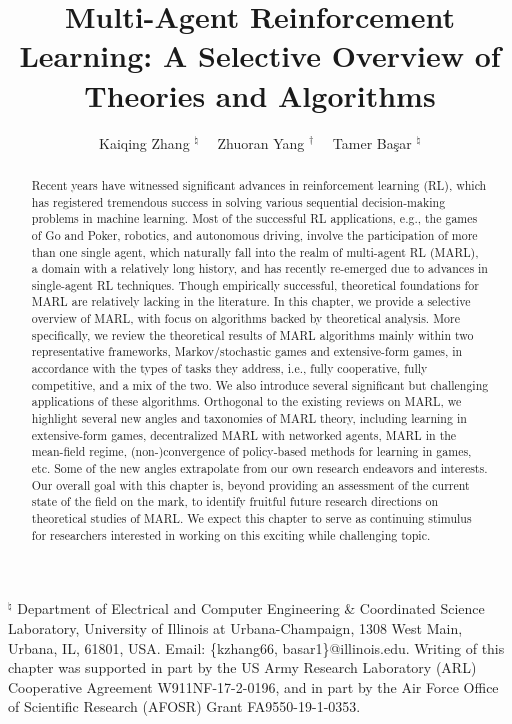 \documentclass[10pt]{article}
\title{Multi-Agent Reinforcement Learning: A Selective Overview of Theories and Algorithms }
\author{Kaiqing Zhang ${ }^{\natural} \quad$ Zhuoran Yang ${ }^{\dagger} \quad$ Tamer Başar ${ }^{\natural}$}
\date{}
\begin{document}
\maketitle


\begin{abstract}
Recent years have witnessed significant advances in reinforcement learning (RL), which has registered tremendous success in solving various sequential decision-making problems in machine learning. Most of the successful RL applications, e.g., the games of Go and Poker, robotics, and autonomous driving, involve the participation of more than one single agent, which naturally fall into the realm of multi-agent RL (MARL), a domain with a relatively long history, and has recently re-emerged due to advances in single-agent RL techniques. Though empirically successful, theoretical foundations for MARL are relatively lacking in the literature. In this chapter, we provide a selective overview of MARL, with focus on algorithms backed by theoretical analysis. More specifically, we review the theoretical results of MARL algorithms mainly within two representative frameworks, Markov/stochastic games and extensive-form games, in accordance with the types of tasks they address, i.e., fully cooperative, fully competitive, and a mix of the two. We also introduce several significant but challenging applications of these algorithms. Orthogonal to the existing reviews on MARL, we highlight several new angles and taxonomies of MARL theory, including learning in extensive-form games, decentralized MARL with networked agents, MARL in the mean-field regime, (non-)convergence of policy-based methods for learning in games, etc. Some of the new angles extrapolate from our own research endeavors and interests. Our overall goal with this chapter is, beyond providing an assessment of the current state of the field on the mark, to identify fruitful future research directions on theoretical studies of MARL. We expect this chapter to serve as continuing stimulus for researchers interested in working on this exciting while challenging topic.
\end{abstract}

${ }^{\natural}$ Department of Electrical and Computer Engineering \& Coordinated Science Laboratory, University of Illinois at Urbana-Champaign, 1308 West Main, Urbana, IL, 61801, USA. Email: \{kzhang66, basar1\}@illinois.edu. Writing of this chapter was supported in part by the US Army Research Laboratory (ARL) Cooperative Agreement W911NF-17-2-0196, and in part by the Air Force Office of Scientific Research (AFOSR) Grant FA9550-19-1-0353.
\end{document}
